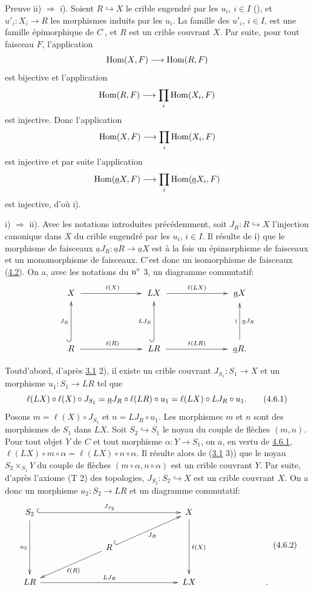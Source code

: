 \documentclass[10pt]{../fichiers-configuration-latex/smfart}
\begin{document}
\begin{enonce*}[remark]{Preuve}
ii) $\Rightarrow$ i). Soient $R\hookrightarrow X$ le crible
engendré par les $u_i$, $i\in I$ (), et
$u'_i:X_i\rightarrow R$ les morphismes induits par les $u_i$. La
famille des $u'_i$, $i\in I$, est une famille épimorphique de
$C^{\widehat{\phantom{,}}}$, et $R$ est un crible couvrant $X$. Par
suite, pour tout faisceau $F$, l'application
$$
\operatorname{Hom}(X,F)\longrightarrow \operatorname{Hom}(R,F)
$$
est bijective et l'application
$$
\operatorname{Hom}(R,F)\longrightarrow \prod_i \operatorname{Hom}(X_i,F)
$$
est injective. Donc l'application
$$
\operatorname{Hom}(X,F)\longrightarrow \prod_i\operatorname{Hom}(X_i,F)
$$
est injective et par suite l'application
$$
\operatorname{Hom}(\underline{a}X,F)\longrightarrow \prod_i \operatorname{Hom}(\underline{a}X_i,F)
$$
est injective, d'où i).

\noindent i) $\Rightarrow$ ii). Avec les notations introduites
précédemment, soit $J_R:R\hookrightarrow X$ l'injection
canonique dans $X$ du crible engendré par les $u_i$, $i\in I$. Il
résulte de i) que le morphisme de faisceaux
$\underline{a}J_R:\underline{a}R\rightarrow \underline{a}X$ est à la fois un
épimorphisme de faisceaux et un monomorphisme de faisceaux. C'est
donc un isomorphisme de faisceaux (\hyperref[II.prop4.2]{4.2}). On a, avec les
notations du ${\rm n^{\circ}}$ 3, un diagramme commutatif:
\[
\xymatrix@C=2.5cm@R=1.5cm@M=.25cm{
X \ar[r]^{\ell(X)} & LX \ar[r]^{\ell(LX)} & \mathsf{\underline{a}}X\\
R \ar[r]^{\ell(R)} \ar@{^{(}->}[u]^{J_R}& LR \ar[r]^{\ell(LR)}
\ar@{^{(}->}[u]^{LJ_R}& \mathsf{\underline{a}}R
\ar[u]^{\wr}_{\mathsf{\underline{a}}J_R}. }
\]
Tout\pageoriginale d'abord, d'après \hyperref[II.lem3.1]{3.1} 2), il existe un
crible couvrant $J_{S_1}:S_1\rightarrow X$ et un morphisme
$u_1:S_1\rightarrow LR$ tel que
\begin{equation}
\ell(LX)\circ \ell (X)\circ J_{S_1}=\underline{a}J_R\circ \ell (LR)\circ
u_1=\ell(LX)\circ LJ_R\circ u_1{}.\tag{4.6.1}
\end{equation}
Posons $m=\ell(X)\circ J_{S_1}$ et $n=LJ_R\circ u_1$. Les morphismes
$m$ et $n$ sont des morphismes de $S_1$ dans $LX$. Soit
$S_2\hookrightarrow S_1$ le noyau du couple de flèches $(m,n)$. Pour
tout objet $Y$ de $C$ et tout morphisme $\alpha:Y\rightarrow S_1$,
on $a$, en vertu de \hyperref[II.eq4.6.1]{4.6.1}, $\ell(LX)\circ m\circ \alpha
=\ell(LX)\circ n\circ\alpha$. Il résulte alors de (\hyperref[II.lem3.1]{3.1}
3)) que le noyau $S_2\times_{S_1}Y$ du couple de flèches $(m\circ
\alpha, n\circ \alpha)$ est un crible couvrant $Y$. Par suite,
d'après l'axiome (T 2) des topologies, $J_{S_2}:S_2\hookrightarrow
X$ est un crible couvrant $X$. On a donc un morphisme
$u_2:S_2\rightarrow LR$ et un diagramme commutatif:
\[\vcenter{
\xymatrix@C=2.5cm@R=.8cm@M=.2cm{
S_2 \ar@{^{(}->}[rr]^{J_{S_{2}}} \ar[dd]_{u_2}&  &X \ar[dd]^{\ell(X)}\\
                  &R\ar@{^{(}->}[ru]_{J_R} \ar[ld]^{\ell(R)}&\\
LR \ar[rr]^{LJ_R}  &  &LX&. }}\leqno{(4.6.2)}
\]


\end{enonce*}
\end{document}
